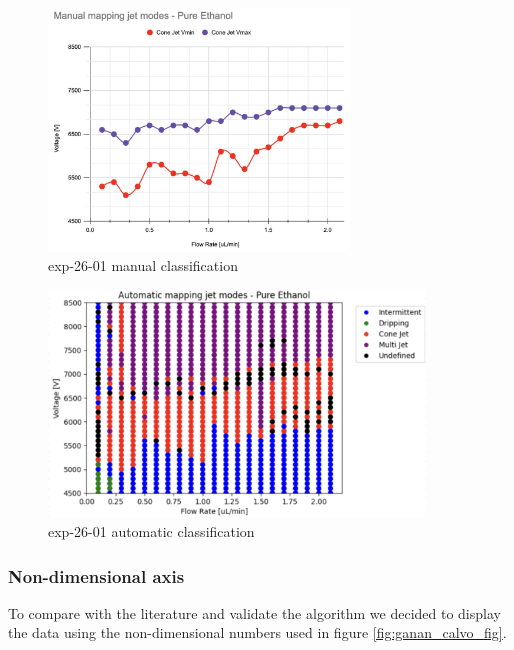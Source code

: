     \begin{multicols}{2}


        \begin{figure}[H]
            \center
            \includegraphics[width=8cm]{Figuras/april/map5.png}
            \caption{ exp-26-01 manual classification}
        \end{figure}

        \begin{figure}[H]
            \center
            \includegraphics[width=10cm]{Figuras/april/map2.png}
            \caption{ exp-26-01 automatic classification}
        \end{figure}


    \end{multicols}

    \subsubsection{Non-dimensional axis}

    To compare with the literature and validate the algorithm we decided to display the data using the non-dimensional numbers used in figure \ref{fig:ganan_calvo_fig}.

